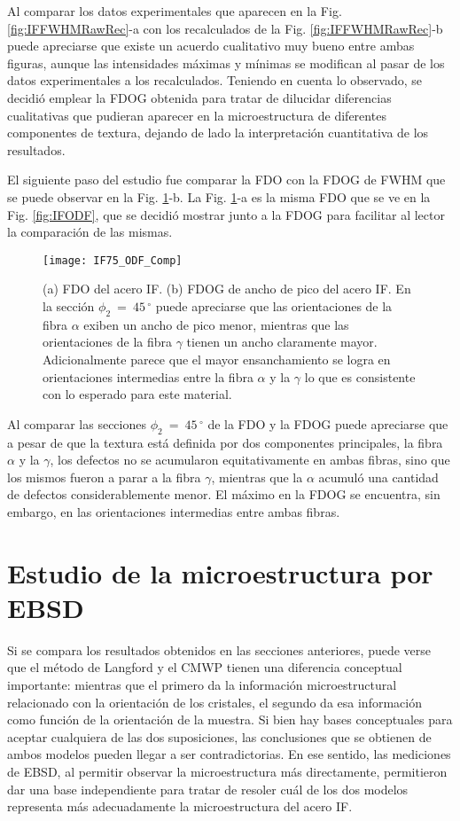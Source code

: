 Al comparar los datos experimentales que aparecen en la Fig. \ref{fig:IFFWHMRawRec}-a con los recalculados de la Fig. \ref{fig:IFFWHMRawRec}-b puede apreciarse que existe un acuerdo cualitativo muy bueno entre ambas figuras, aunque las intensidades máximas y mínimas se modifican al pasar de los datos experimentales a los recalculados.
Teniendo en cuenta lo observado, se decidió emplear la FDOG obtenida para tratar de dilucidar diferencias cualitativas que pudieran aparecer en la microestructura de diferentes componentes de textura, dejando de lado la interpretación cuantitativa de los resultados.

El siguiente paso del estudio fue comparar la FDO con la FDOG de FWHM que se puede observar en la Fig. \ref{fig:IFODFComp}-b.
La Fig. \ref{fig:IFODFComp}-a es la misma FDO que se ve en la Fig. \ref{fig:IFODF}, que se decidió mostrar junto a la FDOG para facilitar al lector la comparación de las mismas.
\begin{figure}[!htb]
  \centering
  \texttt{[image: IF75\_ODF\_Comp]}
  \caption{(a) FDO del acero IF. (b) FDOG de ancho de pico del acero IF. En la sección $\phi_2 \ = \ 45$\,$^{\circ}$ puede apreciarse que las orientaciones de la fibra $\alpha$ exiben un ancho de pico menor, mientras que las orientaciones de la fibra $\gamma$ tienen un ancho claramente mayor. Adicionalmente parece que el mayor ensanchamiento se logra en orientaciones intermedias entre la fibra $\alpha$ y la $\gamma$ lo que es consistente con lo esperado para este material.}
  \label{fig:IFODFComp}
\end{figure}

Al comparar las secciones $\phi_2 \ = \ 45$\,$^{\circ}$ de la FDO y la FDOG puede apreciarse que a pesar de que la textura está definida por dos componentes principales, la fibra $\alpha$ y  la $\gamma$, los defectos no se acumularon equitativamente en ambas fibras, sino que los mismos fueron a parar a la fibra $\gamma$, mientras que la $\alpha$ acumuló una cantidad de defectos considerablemente menor.
El máximo en la FDOG se encuentra, sin embargo, en las orientaciones intermedias entre ambas fibras.

\newpage
\section{Estudio de la microestructura por EBSD}\label{S:IFEBSD}
Si se compara los resultados obtenidos en las secciones anteriores, puede verse que el método de Langford y el CMWP tienen una diferencia conceptual importante: mientras que el primero da la información microestructural relacionado con la orientación de los cristales, el segundo da esa información como función de la orientación de la muestra.
Si bien hay bases conceptuales para aceptar cualquiera de las dos suposiciones, las conclusiones que se obtienen de ambos modelos pueden llegar a ser contradictorias.
En ese sentido, las mediciones de EBSD, al permitir observar la microestructura más directamente, permitieron dar una base independiente para tratar de resoler cuál de los dos modelos representa más adecuadamente la microestructura del acero IF.

